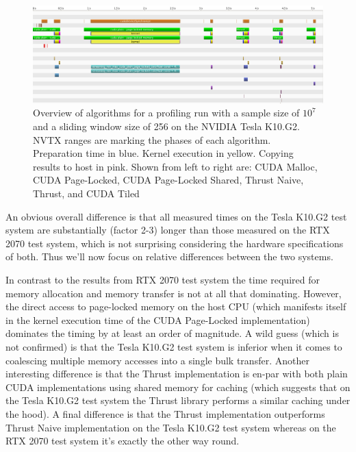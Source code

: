 \begin{figure}
    \centering
    \includegraphics[width=1.0\linewidth]{Figures/group_picture_tesla_k10g2}
    \caption{Overview of algorithms for a profiling run with a sample size of $10^7$and a sliding window size of 256 on the NVIDIA Tesla K10.G2. NVTX ranges are marking the phases of each algorithm. Preparation time in blue. Kernel execution in yellow. Copying results to host in pink. Shown from left to right are: CUDA Malloc, CUDA Page-Locked, CUDA Page-Locked Shared, Thrust Naive, Thrust, and CUDA Tiled}
    \label{fig:group_picture_tesla_k10g2}
\end{figure}

An obvious overall difference is that all measured times on the 
Tesla K10.G2 test system are substantially (factor 2-3) longer than those measured on the RTX 2070 test system, which is not surprising considering the hardware specifications of both. Thus we'll now focus on relative differences between the two systems.

In contrast to the results from RTX 2070 test system the time required for memory allocation and memory transfer is not at all that dominating. However, the direct access to page-locked memory on the host CPU (which manifests itself in the kernel execution time of the CUDA Page-Locked implementation) dominates the timing by at least an order of magnitude. A wild guess (which is not confirmed) is that the Tesla K10.G2 test system is inferior when it comes to coalescing multiple memory accesses into a single bulk transfer. Another interesting difference is that the Thrust implementation is en-par with both plain CUDA implementations using shared memory for caching (which suggests that on the Tesla K10.G2 test system the Thrust library performs a similar caching under the hood). A final difference is that the Thrust implementation outperforms Thrust Naive implementation  on the Tesla K10.G2 test system whereas on the RTX 2070 test system it's exactly the other way round.

